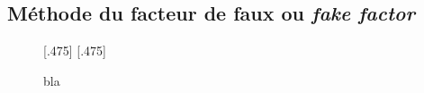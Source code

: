 \subsection{Méthode du facteur de faux ou \emph{fake factor}}\label{chapter-HTT_analysis-section-bg_estimation-FF_method}


\begin{figure}
\centering

[.475\textwidth]
{}
\hfill
{}[.475\textwidth]
{}

\caption{bla}
\end{figure}